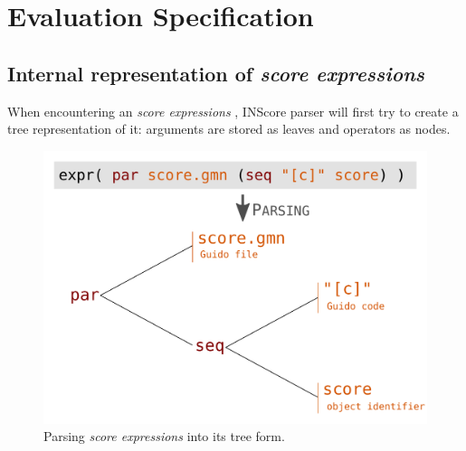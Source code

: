 \documentclass{article}
\newcommand{\sExpr}{\emph{score expressions} }
\begin{document}




\section{Evaluation Specification}


\subsection{Internal representation of \sExpr}

When encountering an \sExpr, INScore parser will first try to create a tree representation of it: arguments are stored as leaves and operators as nodes.

\begin{figure}[th]
\centering
\includegraphics[width=0.9\columnwidth]{imgs/exprParse}
\caption{Parsing \sExpr into its tree form.
\label{fig:parsing}}
\end{figure}
\end{document}
